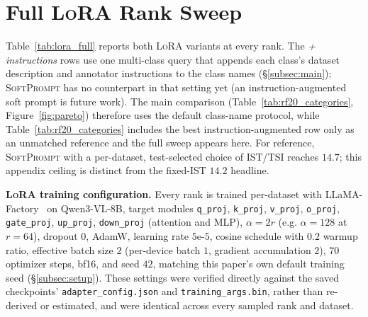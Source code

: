 \documentclass{article}
\newcommand{\ours}{\textsc{SoftPrompt}}
\newcommand{\lora}{\textsc{LoRA}}
\newcommand{\qwen}{Qwen3-VL}
\begin{document}
\section{Full \lora{} Rank Sweep}
\label{app:lora_sweep}

Table~\ref{tab:lora_full} reports both \lora{} variants at every rank.
The \emph{+ instructions} rows use one multi-class query that appends each
class's dataset description and annotator instructions to the class names
(\S\ref{subsec:main}); \ours{} has no counterpart in that setting yet (an
instruction-augmented soft prompt is future work). The main comparison
(Table~\ref{tab:rf20_categories}, Figure~\ref{fig:pareto}) therefore uses the
default class-name protocol, while Table~\ref{tab:rf20_categories} includes
the best instruction-augmented row only as an unmatched reference and the full
sweep appears here.
For reference, \ours{} with a per-dataset, test-selected choice of IST/TSI
reaches $14.7$; this appendix ceiling is distinct from the fixed-IST $14.2$
headline.

\textbf{\lora{} training configuration.} Every rank is trained per-dataset with LLaMA-Factory~\citep{zheng2024llamafactory} on \qwen{}-8B, target modules \texttt{q\_proj}, \texttt{k\_proj}, \texttt{v\_proj}, \texttt{o\_proj}, \texttt{gate\_proj}, \texttt{up\_proj}, \texttt{down\_proj} (attention and MLP), $\alpha{=}2r$ (e.g. $\alpha{=}128$ at $r{=}64$), dropout $0$, AdamW, learning rate $5\text{e-}5$, cosine schedule with $0.2$ warmup ratio, effective batch size $2$ (per-device batch $1$, gradient accumulation $2$), $70$ optimizer steps, bf16, and seed $42$, matching this paper's own default training seed (\S\ref{subsec:setup}). These settings were verified directly against the saved checkpoints' \texttt{adapter\_config.json} and \texttt{training\_args.bin}, rather than re-derived or estimated, and were identical across every sampled rank and dataset.
\end{document}
